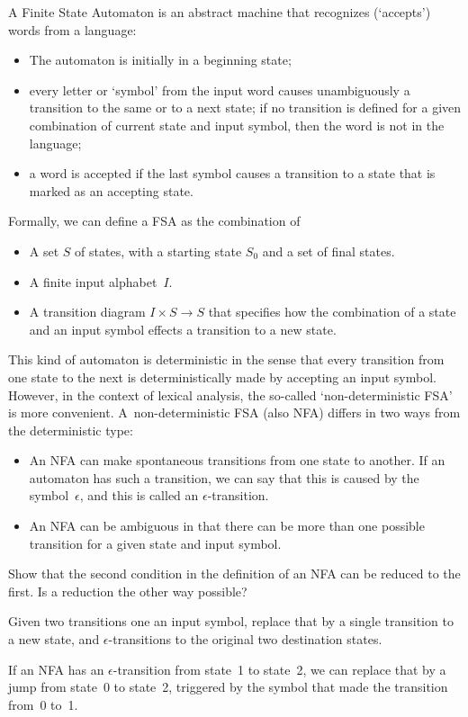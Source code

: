 A Finite State Automaton is an abstract machine that recognizes
(`accepts') words from a language:
\begin{itemize}
\item The automaton is initially in a beginning state;
\item every letter or `symbol' from the input word causes
  unambiguously a transition to the same or
  to a next state; if no transition is defined for a given combination
  of current state and input symbol, then the word is not in the
  language;
\item a word is accepted if the last symbol causes a transition to a
  state that is marked as an accepting state.
\end{itemize}
Formally, we can define a FSA as the combination of 
\begin{itemize}
\item A set $S$ of states, with a starting state $S_0$ and a set of final
  states.
\item A finite input alphabet~$I$.
\item A transition diagram $I\times S\rightarrow S$ that specifies how
  the combination of a state and an input symbol effects a transition
  to a new state.
\end{itemize}
This kind of automaton is deterministic
in the sense that every transition from one state to the next is
deterministically made by accepting an input symbol. However, in the
context of lexical analysis, the so-called `non-deterministic FSA' is more convenient. A~non-deterministic
FSA (also NFA) differs in two
ways from the deterministic type:
\begin{itemize}
\item An NFA can make spontaneous transitions from one state to
  another. If an automaton has such a transition, we can say that this
  is caused by the symbol~$\epsilon$, and this is called an
  $\epsilon$-transition.
\item An NFA can be ambiguous in that there can be more than one
  possible transition for a given state and input symbol.
\end{itemize}

\begin{594exercise}
Show that the second condition in the definition of an NFA
can be reduced to the first. Is a reduction the other way possible?
\end{594exercise}
\begin{answer}
Given two transitions one an input symbol, replace that by a single
transition to a new state, and $\epsilon$-transitions to the original
two destination states.

If an NFA has an $\epsilon$-transition from state~1 to state~2, we can
replace that by a jump from state~0 to state~2, triggered by the
symbol that made the transition from~0 to~1.
\end{answer}

